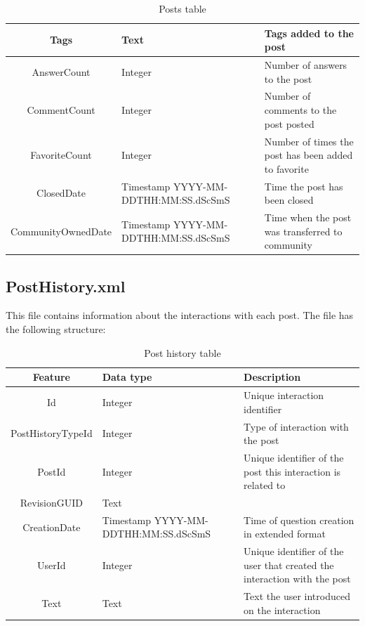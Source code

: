 \documentclass[11pt]{book} %
\begin{document}
\begin{table}[!ht]
\begin{tabular}{|c|p{}|p{}|}
          Tags & Text & Tags added to the post \\ \hline
          AnswerCount & Integer & Number of answers to the post \\ \hline
          CommentCount & Integer & Number of comments to the post posted \\ \hline
          FavoriteCount & Integer & Number of times the post has been added to favorite \\ \hline
          ClosedDate & Timestamp YYYY-MM-DDTHH:MM:SS.dScSmS & Time the post has been closed \\ \hline
          CommunityOwnedDate & Timestamp YYYY-MM-DDTHH:MM:SS.dScSmS & Time when the post was transferred to community\\

          \hline
        \end{tabular}
        \caption{Posts table}
        \label{tab:posts}
      \end{table}

\newpage

    \subsection{PostHistory.xml}

      This file contains information about the interactions with each post. The file has the following structure:

      \begin{table}[!ht]
        \centering
        \begin{tabular}{|c|p{}|p{}|}
          \hline

          Feature & Data type & Description \\ \hline
          Id & Integer & Unique interaction identifier \\ \hline
          PostHistoryTypeId & Integer & Type of interaction with the post \\ \hline
          PostId & Integer & Unique identifier of the post this interaction is related to \\ \hline
          RevisionGUID & Text &  \\ \hline
          CreationDate & Timestamp YYYY-MM-DDTHH:MM:SS.dScSmS & Time of question creation in extended format \\ \hline
          UserId & Integer & Unique identifier of the user that created the interaction with the post \\ \hline
          Text & Text & Text the user introduced on the interaction \\ \hline

          \hline
        \end{tabular}
        \caption{Post history table}
        \label{tab:posthistory}
      \end{table}
\end{document}

